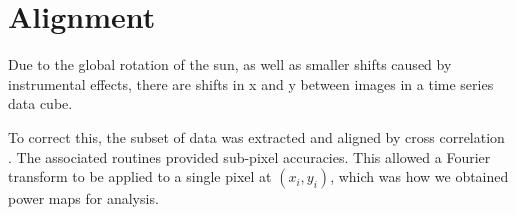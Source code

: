 \clearpage
\section{Alignment}

Due to the global rotation of the sun, as well as smaller shifts caused
by instrumental effects, there are shifts in x and y between
images in a time series data cube.

To correct this,
the subset of data was extracted and aligned by cross correlation
\citep{McAteer2003, McAteer2004}.
The associated routines provided sub-pixel accuracies.
This allowed a Fourier transform to be applied to a single pixel
at $(x_{i}, y_{i})$, which was how we obtained power maps for analysis.
